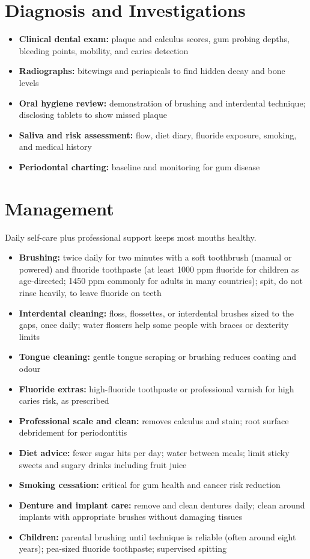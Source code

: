 \section*{Diagnosis and Investigations}
\begin{itemize}
    \item \textbf{Clinical dental exam:} plaque and calculus scores, gum probing depths, bleeding points, mobility, and caries detection
    \item \textbf{Radiographs:} bitewings and periapicals to find hidden decay and bone levels
    \item \textbf{Oral hygiene review:} demonstration of brushing and interdental technique; disclosing tablets to show missed plaque
    \item \textbf{Saliva and risk assessment:} flow, diet diary, fluoride exposure, smoking, and medical history
    \item \textbf{Periodontal charting:} baseline and monitoring for gum disease
\end{itemize}

\section*{Management}
Daily self-care plus professional support keeps most mouths healthy.

\begin{itemize}
    \item \textbf{Brushing:} twice daily for two minutes with a soft toothbrush (manual or powered) and fluoride toothpaste (at least 1000 ppm fluoride for children as age-directed; 1450 ppm commonly for adults in many countries); spit, do not rinse heavily, to leave fluoride on teeth
    \item \textbf{Interdental cleaning:} floss, flossettes, or interdental brushes sized to the gaps, once daily; water flossers help some people with braces or dexterity limits
    \item \textbf{Tongue cleaning:} gentle tongue scraping or brushing reduces coating and odour
    \item \textbf{Fluoride extras:} high-fluoride toothpaste or professional varnish for high caries risk, as prescribed
    \item \textbf{Professional scale and clean:} removes calculus and stain; root surface debridement for periodontitis
    \item \textbf{Diet advice:} fewer sugar hits per day; water between meals; limit sticky sweets and sugary drinks including fruit juice
    \item \textbf{Smoking cessation:} critical for gum health and cancer risk reduction
    \item \textbf{Denture and implant care:} remove and clean dentures daily; clean around implants with appropriate brushes without damaging tissues
    \item \textbf{Children:} parental brushing until technique is reliable (often around eight years); pea-sized fluoride toothpaste; supervised spitting
\end{itemize}

